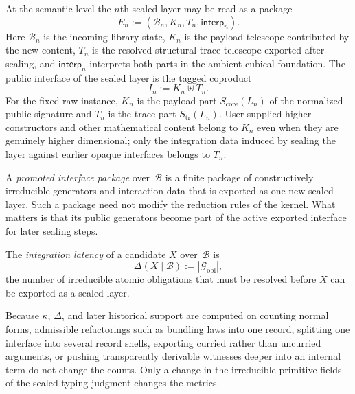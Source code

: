 \documentclass{lmcs}
\newcommand{\B}{\mathcal{B}}
\newcommand{\Gcal}{\mathcal{G}}
\begin{document}
\begin{defi}
\label{def:semantic-sealed-layer}
At the semantic level the $n$th sealed layer may be read as a package
\[
  E_n := (\B_n,K_n,T_n,\mathsf{interp}_n).
\]
Here $\B_n$ is the incoming library state, $K_n$ is the payload telescope
contributed by the new content, $T_n$ is the resolved structural trace telescope
exported after sealing, and $\mathsf{interp}_n$ interprets both parts in the
ambient cubical foundation. The public interface of the sealed layer is the
tagged coproduct
\[
  I_n := K_n \uplus T_n.
\]
For the fixed raw instance, $K_n$ is the payload part $S_{\mathrm{core}}(L_n)$
of the normalized public signature and $T_n$ is the trace part
$S_{\mathrm{tr}}(L_n)$. User-supplied higher constructors and other
mathematical content belong to $K_n$ even when they are genuinely higher
dimensional; only the integration data induced by sealing the layer against
earlier opaque interfaces belongs to $T_n$.
\end{defi}

\begin{defi}
\label{def:promoted}
A \emph{promoted interface package} over~$\B$ is a finite package of constructively irreducible generators and interaction data that is exported as one new sealed layer. Such a package need not modify the reduction rules of the kernel. What matters is that its public generators become part of the active exported interface for later sealing steps.
\end{defi}

\begin{defi}
\label{def:latency}
The \emph{integration latency} of a candidate $X$ over~$\B$ is
\[
  \Delta(X \mid \B) := |\Gcal_{\mathrm{obl}}|,
\]
the number of irreducible atomic obligations that must be resolved before $X$ can be exported as a sealed layer.
\end{defi}

\begin{rem}
\label{rem:refactor-invariance}
Because $\kappa$, $\Delta$, and later historical support are computed on counting normal forms, admissible refactorings such as bundling laws into one record, splitting one interface into several record shells, exporting curried rather than uncurried arguments, or pushing transparently derivable witnesses deeper into an internal term do not change the counts. Only a change in the irreducible primitive fields of the sealed typing judgment changes the metrics.
\end{rem}
\end{document}

